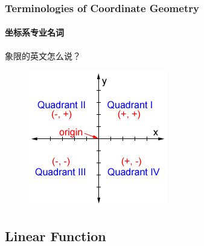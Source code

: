 \documentclass[
	11pt, %
	handout,
]{beamer}
\begin{document}
\begin{frame}
	\frametitle{Terminologies of Coordinate Geometry}
	\framesubtitle{坐标系专业名词}
	{\LARGE 象限的英文怎么说？}
	\pause
	\begin{figure}
		\includegraphics[width=0.5\linewidth]{Signs_Of_Quadrant.png}
	\end{figure}
\end{frame}


\subsection{Linear Function}

\end{document}

